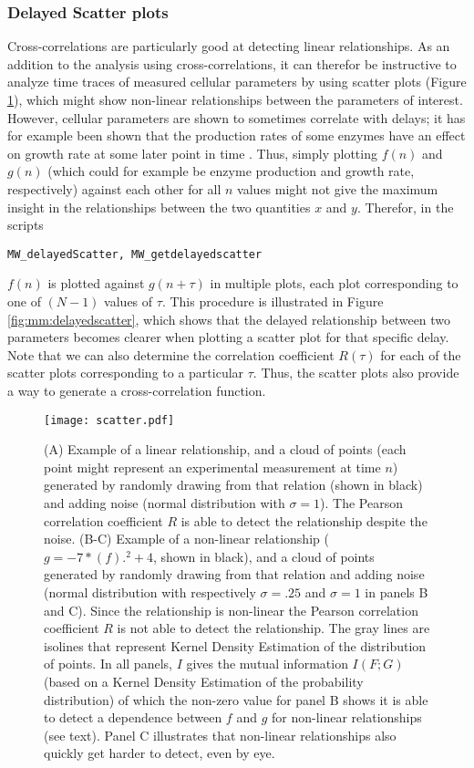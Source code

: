 {\subsubsection{Delayed Scatter plots}

Cross-correlations are particularly good at detecting linear relationships.
As an addition to the analysis using cross-correlations, 
it can therefor be instructive to analyze time traces of measured cellular parameters by using scatter plots (Figure \ref{fig:mm:scatter}), 
which might show non-linear relationships between the parameters of interest. 
%
However, cellular parameters are shown to sometimes correlate with delays; it has for example been shown that the production rates of some enzymes have an effect on growth rate at some later point in time \cite{Kiviet2014}.
Thus, simply plotting $f(n)$ and $g(n)$ (which could for example be enzyme production and growth rate, respectively) against each other for all $n$ values might not give the maximum insight in the relationships between the two quantities $x$ and $y$.
Therefor, in the scripts
\begin{verbatim}
MW_delayedScatter, MW_getdelayedscatter
\end{verbatim}
$f(n)$ is plotted against $g(n+\tau)$ in multiple plots, each plot corresponding to one of $(N-1)$ values of $\tau$.
This procedure is illustrated in Figure \ref{fig:mm:delayedscatter}, which shows that the delayed relationship between two parameters becomes clearer when plotting a scatter plot for that specific delay.
% 
Note that we can also determine the correlation coefficient $R(\tau)$ for each of the scatter plots corresponding to a particular $\tau$.
Thus, the scatter plots also provide a way to generate a cross-correlation function.

\begin{figure}
	\centering
	\texttt{[image: scatter.pdf]}
	\caption{ 
		(A) Example of a linear relationship, and a cloud of points (each point might represent an experimental measurement at time $n$) generated by randomly drawing from that relation (shown in black) and adding noise (normal distribution with $\sigma=1$). The Pearson correlation coefficient $R$ is able to detect the relationship despite the noise.
		(B-C) Example of a non-linear relationship ($g=-7*(f).^2+4$, shown in black), and a cloud of points generated by randomly drawing from that relation and adding noise (normal distribution with respectively $\sigma=.25$ and $\sigma=1$ in panels B and C). Since the relationship is non-linear the Pearson correlation coefficient $R$ is not able to detect the relationship. The gray lines are isolines that represent Kernel Density Estimation of the distribution of points.
		In all panels, $I$ gives the mutual information $I(F;G)$ (based on a Kernel Density Estimation of the probability distribution) of which the non-zero value for panel B shows it is able to detect a dependence between $f$ and $g$ for non-linear relationships (see text). Panel C illustrates that non-linear relationships also quickly get harder to detect, even by eye.
	}
	\label{fig:mm:scatter}
\end{figure}


}
